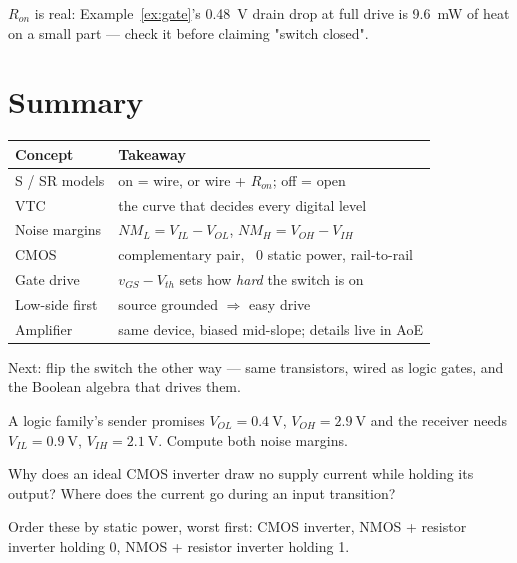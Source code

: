 \begin{tripwire}
$R_{on}$ is real: Example~\ref{ex:gate}'s \qty{0.48}{\volt} drain drop at
full drive is \qty{9.6}{\milli\watt} of heat on a small part — check it
before claiming "switch closed".
\end{tripwire}

\section{Summary}
\label{sec:transistor-summary}

\begin{tabularx}{\linewidth}{l X}
\toprule
Concept & Takeaway \\
\midrule
S / SR models & on = wire, or wire + $R_{on}$; off = open \\
VTC & the curve that decides every digital level \\
Noise margins & $NM_L = V_{IL}-V_{OL}$, $NM_H = V_{OH}-V_{IH}$ \\
CMOS & complementary pair, ~0 static power, rail-to-rail \\
Gate drive & $v_{GS}-V_{th}$ sets how \emph{hard} the switch is on \\
Low-side first & source grounded $\Rightarrow$ easy drive \\
Amplifier & same device, biased mid-slope; details live in AoE \\
\bottomrule
\end{tabularx}

\bigskip
Next: flip the switch the other way — same transistors, wired as logic
gates, and the Boolean algebra that drives them.

\begin{exercise}[easy]
A logic family's sender promises $V_{OL}=\qty{0.4}{\volt}$,
$V_{OH}=\qty{2.9}{\volt}$ and the receiver needs $V_{IL}=\qty{0.9}{\volt}$,
$V_{IH}=\qty{2.1}{\volt}$. Compute both noise margins.
\end{exercise}

\begin{exercise}[easy]
Why does an ideal CMOS inverter draw no supply current while holding its
output? Where does the current go during an input transition?
\end{exercise}

\begin{exercise}[easy]
Order these by static power, worst first: CMOS inverter, NMOS + resistor
inverter holding 0, NMOS + resistor inverter holding 1.
\end{exercise}


